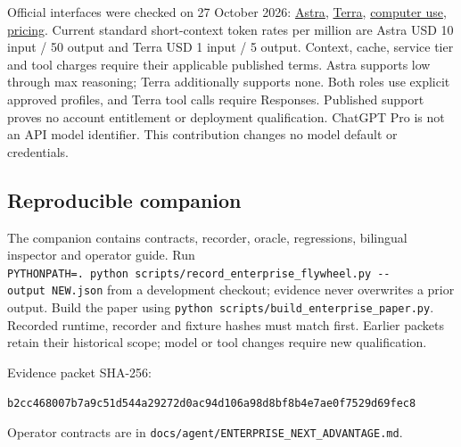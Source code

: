 \documentclass[
  10pt,
]{article}
\begin{document}
Official interfaces were checked on 27 October 2026:
\href{https://developers.openai.com/api/docs/models/gpt-6-astra}{Astra},
\href{https://developers.openai.com/api/docs/models/gpt-6.1-terra}{Terra},
\href{https://developers.openai.com/api/docs/guides/tools-computer-use}{computer
use}, \href{https://developers.openai.com/api/docs/pricing}{pricing}.
Current standard short-context token rates per million are Astra USD 10
input / 50 output and Terra USD 1 input / 5 output. Context, cache,
service tier and tool charges require their applicable published terms.
Astra supports low through max reasoning; Terra additionally supports
none. Both roles use explicit approved profiles, and Terra tool calls
require Responses. Published support proves no account entitlement or
deployment qualification. ChatGPT Pro is not an API model identifier.
This contribution changes no model default or credentials.

\hypertarget{reproducible-companion}{%
\subsection{Reproducible companion}\label{reproducible-companion}}

The companion contains contracts, recorder, oracle, regressions,
bilingual inspector and operator guide. Run
\texttt{PYTHONPATH=.\ python\ scripts/record\_enterprise\_flywheel.py\ -\/-output\ NEW.json}
from a development checkout; evidence never overwrites a prior output.
Build the paper using
\texttt{python\ scripts/build\_enterprise\_paper.py}. Recorded runtime,
recorder and fixture hashes must match first. Earlier packets retain
their historical scope; model or tool changes require new qualification.

Evidence packet SHA-256:

\texttt{b2cc468007b7a9c51d544a29272d0ac94d106a98d8bf8b4e7ae0f7529d69fec8}

Operator contracts are in
\texttt{docs/agent/ENTERPRISE\_NEXT\_ADVANTAGE.md}.
\end{document}
